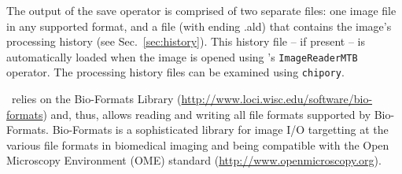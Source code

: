 The output of the save operator is comprised of two separate files: one image file in any supported
format, and a file (with ending .ald) that contains the image's processing history (see
Sec.~\ref{sec:history}). This history file -- if present -- is automatically
loaded when the image is opened using \mitobo's {\tt ImageReaderMTB} operator. The processing
history files can be examined using {\tt chipory}.

\mitobo~relies on the Bio-Formats Library
(\url{http://www.loci.wisc.edu/software/bio-formats}) and, thus, allows reading and writing
all file formats supported by Bio-Formats. Bio-Formats is a sophisticated library for image I/O
targetting at the various file formats in biomedical imaging and being compatible with the Open Microscopy Environment
(OME) standard (\url{http://www.openmicroscopy.org}).



